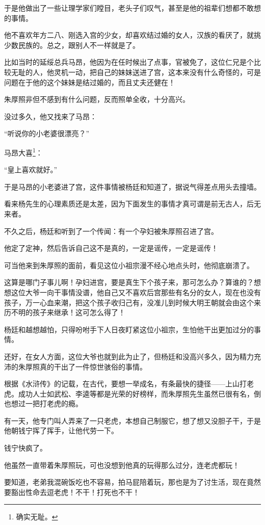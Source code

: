 \begin{multicols}{\theparacolNo}
		于是他做出了一些让理学家们瞠目，老头子们叹气，甚至是他的祖辈们想都不敢想的事情。

		他不喜欢年方二八、刚选入宫的少女，却喜欢结过婚的女人，汉族的看厌了，就挑少数民族的。总之，跟别人不一样就是了。

		比如当时的延绥总兵马昂，他因为在任时候出了点事，官被免了，这位仁兄是个比较无耻的人，他灵机一动，把自己的妹妹送进了宫，这本来没有什么奇怪的，可是问题在于他的这个妹妹是结过婚的，而且丈夫还健在！

		朱厚照非但不感到有什么问题，反而照单全收，十分高兴。

		没过多久，他又找来了马昂：

		“听说你的小老婆很漂亮？”

		马昂大喜\footnote{确实无耻。}：

		“皇上喜欢就好。”

		于是马昂的小老婆进了宫，这件事情被杨廷和知道了，据说气得差点用头去撞墙。

		看来杨先生的心理素质还是太差，因为下面发生的事情才真可谓是前无古人，后无来者。

		不久之后，杨廷和听到了一个传闻：有一个孕妇被朱厚照召进了宫。

		他定了定神，然后告诉自己这不是真的，一定是谣传，一定是谣传！

		可当他来到朱厚照的面前，看见这位小祖宗漫不经心地点头时，他彻底崩溃了。

		这算是哪门子事儿啊！孕妇进宫，要是真生下个孩子来，那可怎么办？算谁的？想想这位大爷一向干事情没谱，他自己又不喜欢后宫那些有名分的女人，现在也没有孩子，万一心血来潮，把这个孩子收归己有，没准儿到时候大明王朝就会由这个来历不明的孩子来继承！这可怎么得了！

		杨廷和越想越怕，只得吩咐手下人日夜盯紧这位小祖宗，生怕他干出更加过分的事情。

		还好，在女人方面，这位大爷也就到此为止了，但杨廷和没高兴多久，因为精力充沛的朱厚照真的干出了一件惊世骇俗的事情。

		根据《水浒传》的记载，在古代，要想一举成名，有条最快的捷径——上山打老虎。成功人士如武松、李逵等都是光荣的好榜样，而朱厚照先生虽然已很有名，倒也想过一把打老虎的瘾。

		有一天，他专门叫人弄来了一只老虎，本想自己制服它，想了想又没胆子干，于是他朝钱宁挥了挥手，让他代劳一下。

		钱宁快疯了。

		他虽然一直带着朱厚照玩，可也没想到他真的玩得那么过分，连老虎都玩！

		要知道，老弟我混碗饭吃也不容易，拍马屁陪着玩，那也是为了讨生活，现在竟然要豁出性命去逗老虎！不干！打死也不干！


\end{multicols}
